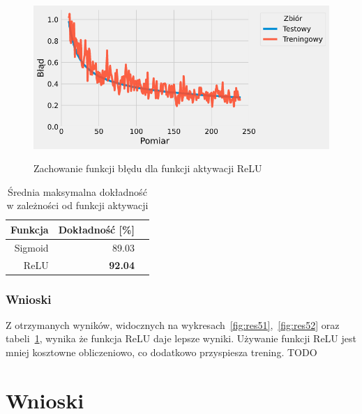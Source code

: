 \documentclass{article}
\begin{document}
\begin{figure}[H]
	\centering
	\caption{Zachowanie funkcji błędu dla funkcji aktywacji ReLU}
	\includegraphics[width=\textwidth]{activation_err_relu.png}
	\label{fig:res54}
\end{figure}

\begin{table}[H]
	\caption{Średnia maksymalna dokładność w zależności od funkcji aktywacji}
	\label{tabela-res-51}
	\centering
	\begin{tabular}{rrr}
		\toprule
		Funkcja & Dokładność [\%] \\
		\midrule
		Sigmoid & 89.03              \\
		ReLU    & \textbf{92.04}     \\
		\bottomrule
	\end{tabular}
\end{table}

\subsubsection*{Wnioski}

Z otrzymanych wyników, widocznych na wykresach~\ref{fig:res51},~\ref{fig:res52} oraz tabeli~\ref{tabela-res-51}, wynika że funkcja ReLU daje lepsze wyniki. Używanie funkcji ReLU jest mniej kosztowne obliczeniowo, co dodatkowo przyspiesza trening.
TODO


\newpage
\section{Wnioski}
\end{document}
